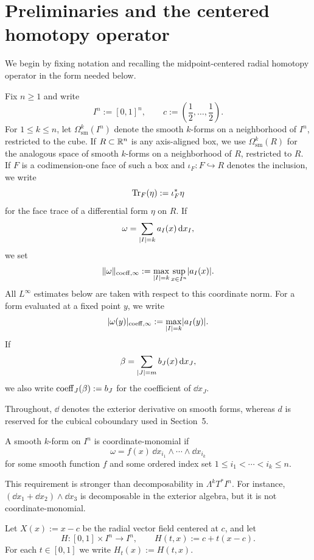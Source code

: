 \section{Preliminaries and the centered homotopy operator}

We begin by fixing notation and recalling the midpoint-centered radial
homotopy operator in the form needed below.

Fix $n\ge 1$ and write
\[
I^n:=[0,1]^n,
\qquad
c:=\left(\frac12,\dots,\frac12\right).
\]
For $1\le k\le n$, let $\Omega^k_{\mathrm{sm}}(I^n)$ denote the smooth
$k$-forms on a neighborhood of $I^n$, restricted to the cube. If
$R\subset\mathbb{R}^n$ is any axis-aligned box, we use $\Omega^k_{\mathrm{sm}}(R)$ for
the analogous space of smooth $k$-forms on a neighborhood of $R$, restricted
to $R$. If $F$ is a codimension-one face of such a box and
$\iota_F:F\hookrightarrow R$ denotes the inclusion, we write
\[
\operatorname{Tr}_F(\eta):=\iota_F^\ast\eta
\]
for the face trace of a differential form $\eta$ on $R$. If
\[
\omega=\sum_{\lvert I \rvert=k} a_I(x)\,\mathrm{d} x_I,
\]
we set
\[
\lVert \omega \rVert_{\mathrm{coeff},\infty}:=
\max_{\lvert I \rvert=k}\sup_{x\in I^n}\lvert a_I(x) \rvert.
\]
All $L^\infty$ estimates below are taken with respect to this coordinate norm.
For a form evaluated at a fixed point $y$, we write
\[
\lvert \omega(y) \rvert_{\mathrm{coeff},\infty}:=
\max_{\lvert I \rvert=k}\lvert a_I(y) \rvert.
\]
If
\[
\beta=\sum_{\lvert J \rvert=m} b_J(x)\,\mathrm{d} x_J,
\]
we also write $\mathrm{coeff}_J(\beta):=b_J$ for the coefficient of $\dd x_J$.

\begin{remark}
Throughout, $\dd$ denotes the exterior derivative on smooth forms, whereas $d$
is reserved for the cubical coboundary used in Section~5.
\end{remark}

\begin{definition}
\label{def:decomposable-form}
A smooth $k$-form on $I^n$ is coordinate-monomial if
\[
\omega=f(x)\,\dd x_{i_1}\wedge\cdots\wedge \dd x_{i_k}
\]
for some smooth function $f$ and some ordered index set
$1\le i_1<\cdots<i_k\le n$.
\end{definition}

\begin{remark}
This requirement is stronger than decomposability in
$\Lambda^kT^\ast I^n$. For instance,
$(\dd x_1+\dd x_2)\wedge \dd x_3$ is decomposable in the exterior algebra, but
it is not coordinate-monomial.
\end{remark}

Let $X(x):=x-c$ be the radial vector field centered at $c$, and let
\[
H:[0,1]\times I^n\to I^n,
\qquad
H(t,x):=c+t(x-c).
\]
For each $t\in[0,1]$ we write $H_t(x):=H(t,x)$.

